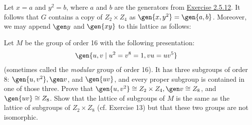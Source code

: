 \begin{sol}
    Let $x = a$ and $y^2 = b$, where $a$ and $b$ are the generators from \hyperref[ex2.5.12]{Exercise 2.5.12}. It follows that $G$ contains a copy of $Z_2 \times Z_4$ as $\gen{x, y^2} = \gen{a, b}$. Moreover, we may append $\gen y$ and $\gen{xy}$ to this lattice as follows:
    \begin{center}
    \end{center}
\end{sol}

\begin{exercise} \label{ex2.5.14} 
    Let $M$ be the group of order 16 with the following presentation:
    \[\gen{u, v \mid u^2 = v^8 = 1, vu = uv^5}\]
    (sometimes called the \emph{modular} group of order 16). It has three subgroups of order 8: $\gen{u, v^2}, \gen v$, and $\gen{uv}$, and every proper subgroup is contained in one of those three. Prove that $\gen{u, v^2} \cong Z_2 \times Z_4, \gen v \cong Z_8$, and $\gen{uv} \cong Z_8$. Show that the lattice of subgroups of $M$ is the same as the lattice of subgroups of $Z_2 \times Z_8$ (cf. Exercise 13) but that these two groups are not isomorphic.
\end{exercise}

